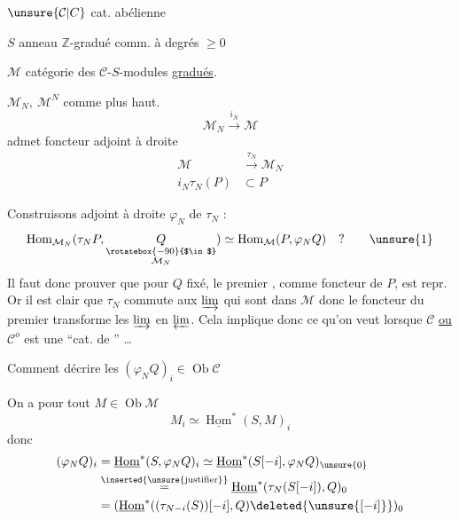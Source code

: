 $\unsure{\mathcal C|C}$ cat. abélienne

$S$ anneau $\mathbb Z$-gradué comm. à degrés $\geq0$

$\mathcal M$ catégorie des $\mathcal C$-$S$-modules \uline{gradués}.

$\mathcal M_N,\ \mathcal M^N$  comme plus haut.
\[
\mathcal M_N\xrightarrow{i_N}\mathcal M
\]
admet foncteur adjoint à droite
\[
\begin{aligned}
\mathcal M&\xrightarrow{\tau_N}\mathcal M_N\\
i_N\tau_N(P)&\subset P
\end{aligned}
\]

Construisons adjoint à droite $\varphi_N$ de $\tau_N$ :
\[
\operatorname{Hom}_{\mathcal M_N}(\tau_N P,\underset{\substack{\rotatebox{-90}{$\in$}\\\mathcal M_N}}{Q})\simeq
\operatorname{Hom}_{\mathcal M}(P,\varphi_N Q)\quad ?\tag*{\unsure{1}}
\]
Il faut donc prouver que pour $Q$ fixé, le premier , comme foncteur de $P$, est repr. Or il est clair que $\tau_N$ commute aux $\varinjlim$ qui sont  dans $\mathcal M$ donc le foncteur du premier  transforme les $\varinjlim$ en $\varprojlim$. Cela implique donc ce qu'on veut lorsque $\mathcal C$ \uline{ou} $\mathcal C^{o}$ est une ``cat. de '' \ldots

Comment  décrire les $(\varphi_N Q)_i\in\operatorname{Ob}\mathcal C$

On a pour \deleted{\unsure{$\varphi$}} tout $M\in\operatorname{Ob}\mathcal M$
\[
M_i\simeq\underline{\operatorname{Hom}}^{*}(S,M)_i
\]
donc
\[
\begin{aligned}
(\varphi_N Q)_i&=\underline{\operatorname{Hom}}^{*}(S,\varphi_N Q)_i\simeq\underline{\operatorname{Hom}}^{*}(S[-i],\varphi_N Q)_{\unsure{0}}\\
&\overset{\text{\inserted{\unsure{justifier}}}}{=}\underline{\operatorname{Hom}}^{*}(\tau_N(S[-i]),Q)_0\\
&=(\underline{\operatorname{Hom}}^{*}((\tau_{N-i}(S))[-i],Q)\deleted{\unsure{[-i]}})_0
\end{aligned}
\]
